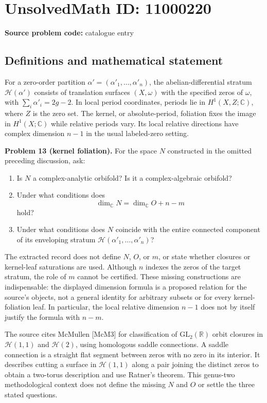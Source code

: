 \documentclass[11pt]{article}
\newcommand{\R}{\mathbb{R}}
\newcommand{\C}{\mathbb{C}}
\begin{document}
\section*{UnsolvedMath ID: 11000220}
\textbf{Source problem code:} catalogue entry
\subsection{Definitions and mathematical statement}
For a zero-order partition $\alpha'=(\alpha'_1,\ldots,\alpha'_n)$, the abelian-differential stratum $\mathcal H(\alpha')$ consists of translation surfaces $(X,\omega)$ with the specified zeros of $\omega$, with $\sum_i\alpha'_i=2g-2$. In local period coordinates, periods lie in $H^1(X,Z;\C)$, where $Z$ is the zero set. The kernel, or absolute-period, foliation fixes the image in $H^1(X;\C)$ while relative periods vary. Its local relative directions have complex dimension $n-1$ in the usual labeled-zero setting.

\textbf{Problem 13 (kernel foliation).} For the space $N$ constructed in the omitted preceding discussion, ask:
\begin{enumerate}
\item Is $N$ a complex-analytic orbifold? Is it a complex-algebraic orbifold?
\item Under what conditions does
\[
 \dim_{\C}N=\dim_{\C}O+n-m
\]
hold?
\item Under what conditions does $N$ coincide with the entire connected component of its enveloping stratum $\mathcal H(\alpha'_1,\ldots,\alpha'_n)$?
\end{enumerate}
The extracted record does not define $N$, $O$, or $m$, or state whether closures or kernel-leaf saturations are used. Although $n$ indexes the zeros of the target stratum, the role of $m$ cannot be certified. These missing constructions are indispensable: the displayed dimension formula is a proposed relation for the source's objects, not a general identity for arbitrary subsets or for every kernel-foliation leaf. In particular, the local relative dimension $n-1$ does not by itself justify the formula with $n-m$.

The source cites McMullen [McM3] for classification of $\mathrm{GL}_2(\R)$ orbit closures in $\mathcal H(1,1)$ and $\mathcal H(2)$, using homologous saddle connections. A saddle connection is a straight flat segment between zeros with no zero in its interior. It describes cutting a surface in $\mathcal H(1,1)$ along a pair joining the distinct zeros to obtain a two-torus description and use Ratner's theorem. This genus-two methodological context does not define the missing $N$ and $O$ or settle the three stated questions.
\end{document}
